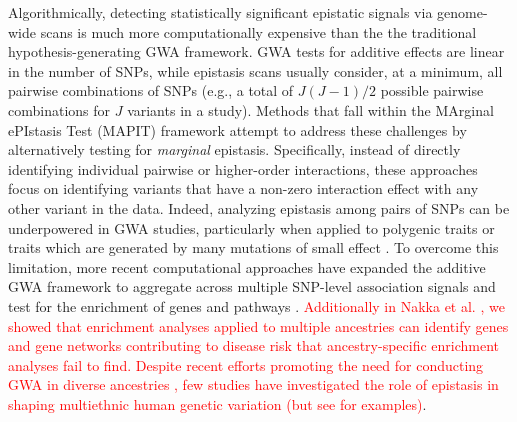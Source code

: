 \documentclass[10pt]{article}
\begin{document}
Algorithmically, detecting statistically significant epistatic signals via genome-wide scans is much more computationally expensive than the the traditional hypothesis-generating GWA framework. GWA tests for additive effects are linear in the number of SNPs, while epistasis scans usually consider, at a minimum, all pairwise combinations of SNPs (e.g., a total of $J(J - 1)/2$ possible pairwise combinations for $J$ variants in a study). Methods that fall within the MArginal ePIstasis Test (MAPIT) framework \cite{Crawford2017a,Crawford2018b,Moore2019,Wang2019} attempt to address these challenges by alternatively testing for \textit{marginal} epistasis. Specifically, instead of directly identifying individual pairwise or higher-order interactions, these approaches focus on identifying variants that have a non-zero interaction effect with any other variant in the data. Indeed, analyzing epistasis among pairs of SNPs can be underpowered in GWA studies, particularly when applied to polygenic traits or traits which are generated by many mutations of small effect \cite{Zhou2013,Yang2014,Bulik-Sullivan2015,Wray2018}. To overcome this limitation, more recent computational approaches have expanded the additive GWA framework to aggregate across multiple SNP-level association signals and test for the enrichment of genes and pathways \cite{Subramanian2005,Cantor2010,Wang2010b,Lee2012,Carbonetto2013,Mooney2014,Gamazon2015,de2016,Nakka2016,Zhu2018,Sun2019,Cheng2020}. \textcolor{red}{Additionally in Nakka et al. \cite{Nakka2017}, we showed that enrichment analyses applied to multiple ancestries can identify genes and gene networks contributing to disease risk that ancestry-specific enrichment analyses fail to find. Despite recent efforts promoting the need for conducting GWA in diverse ancestries \cite{Popejoy2016,Martin2018,Martin2019,Gurdasani2019,Sirugo2019,Wojcik2019}, few studies have investigated the role of epistasis in shaping multiethnic human genetic variation (but see \cite{Ma2012,Fish2016,Choquet2018,Hoffmann2018} for examples)}. 
\end{document}
